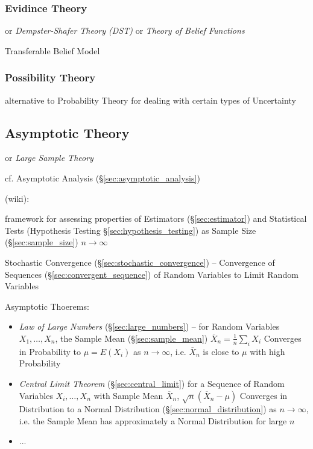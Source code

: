 \subsubsection{Evidince Theory}\label{sec:evidence_theory}

or \emph{Dempster-Shafer Theory (DST)} or \emph{Theory of Belief Functions}

Transferable Belief Model



\subsubsection{Possibility Theory}\label{sec:possibility_theory}

alternative to Probability Theory for dealing with certain types of Uncertainty



\subsection{Asymptotic Theory}\label{sec:asymptotic_theory}

or \emph{Large Sample Theory}

\fist cf. Asymptotic Analysis (\S\ref{sec:asymptotic_analysis})

(wiki):

framework for assessing properties of Estimators (\S\ref{sec:estimator}) and
Statistical Tests (Hypothesis Testing \S\ref{sec:hypothesis_testing}) as Sample
Size (\S\ref{sec:sample_size}) $n \rightarrow \infty$

\fist Stochastic Convergence (\S\ref{sec:stochastic_convergence}) -- Convergence
of Sequences (\S\ref{sec:convergent_sequence}) of Random Variables to Limit
Random Variables

Asymptotic Thoerems:
\begin{itemize}
  \item \emph{Law of Large Numbers} (\S\ref{sec:large_numbers}) --
    for Random Variables $X_1, \ldots, X_n$, the Sample Mean
    (\S\ref{sec:sample_mean}) $\overline{X}_n = \frac{1}{n}\sum_i X_i$ Converges
    in Probability to $\mu = E(X_i)$ as $n \rightarrow \infty$, i.e.
    $\overline{X}_n$ is close to $\mu$ with high Probability
  \item \emph{Central Limit Theorem} (\S\ref{sec:central_limit})
    for a Sequence of Random Variables $X_i, \ldots, X_n$ with Sample Mean
    $\overline{X}_n$, $\sqrt{n}(\overline{X}_n - \mu)$
    Converges in Distribution to a Normal Distribution
    (\S\ref{sec:normal_distribution}) as $n \rightarrow \infty$, i.e. the Sample
    Mean has approximately a Normal Distribution for large $n$
  \item ...
\end{itemize}



